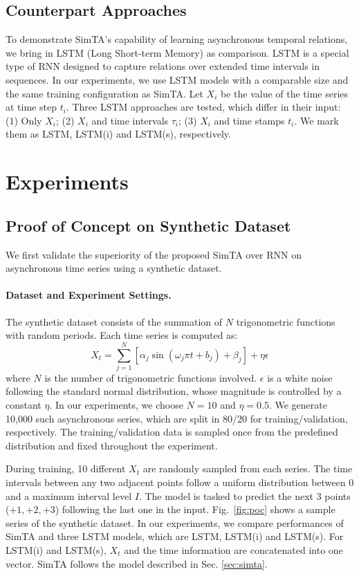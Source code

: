 \documentclass[runningheads]{llncs}
\begin{document}
\subsection{Counterpart Approaches}
	To demonstrate SimTA's capability of learning asynchronous temporal relations, we bring in LSTM (Long Short-term Memory) \cite{Hochreiter1997LongSM,Greff2017LSTMAS} as comparison. LSTM is a special type of RNN designed to capture relations over extended time intervals in sequences. In our experiments, we use LSTM models with a comparable size and the same training configuration as SimTA. Let $X_{i}$ be the value of the time series at time step $t_{i}$. Three LSTM approaches are tested, which differ in their input: (1) Only $X_{i}$; (2) $X_{i}$ and time intervals $\tau_{i}$; (3) $X_{i}$ and time stamps $t_{i}$. We mark them as LSTM, LSTM(i) and LSTM(s), respectively.

\section{Experiments}

\subsection{Proof of Concept on Synthetic Dataset}
	We first validate the superiority of the proposed SimTA over RNN on asynchronous time series using a synthetic dataset.
	\paragraph{\textbf{Dataset and Experiment Settings.}}
	The synthetic dataset consists of the summation of $N$ trigonometric functions with random periods. Each time series is computed as:
	\begin{equation}
	X_{t}=\sum_{j=1}^{N}[{\alpha_{j}\sin(\omega_{j}\pi t+b_{j})+\beta_{j}}]+\eta\epsilon
	\end{equation}
	where $N$ is the number of trigonometric functions involved. $\epsilon$ is a white noise following the standard normal distribution, whose magnitude is controlled by a constant $\eta$. In our experiments, we choose $N=10$ and $\eta=0.5$. We generate 10,000 such asynchronous series, which are split in 80/20 for training/validation, respectively. The training/validation data is sampled once from the predefined distribution and fixed throughout the experiment.
	
	During training, 10 different $X_{t}$ are randomly sampled from each series. The time intervals between any two adjacent points follow a uniform distribution between $0$ and a maximum interval level $I$. The model is tasked to predict the next 3 points ($+1,+2,+3$) following the last one in the input. Fig.~\ref{fig:poc} shows a sample series of the synthetic dataset.
	In our experiments, we compare performances of SimTA and three LSTM models, which are LSTM, LSTM(i) and LSTM(s). For LSTM(i) and LSTM(s), $X_{t}$ and the time information are concatenated into one vector.  SimTA follows the model described in Sec. \ref{sec:simta}.
\end{document}
